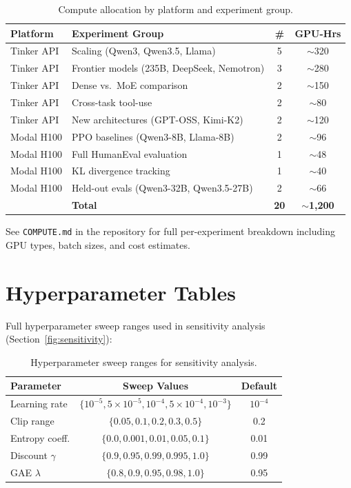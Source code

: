 \documentclass{article}
\begin{document}
\begin{table}[htbp]
\centering
\caption{Compute allocation by platform and experiment group.}
\small
\begin{tabular}{@{}llcc@{}}
\toprule
\textbf{Platform} & \textbf{Experiment Group} & \textbf{\#} & \textbf{GPU-Hrs} \\
\midrule
Tinker API & Scaling (Qwen3, Qwen3.5, Llama) & 5 & $\sim$320 \\
Tinker API & Frontier models (235B, DeepSeek, Nemotron) & 3 & $\sim$280 \\
Tinker API & Dense vs.~MoE comparison & 2 & $\sim$150 \\
Tinker API & Cross-task tool-use & 2 & $\sim$80 \\
Tinker API & New architectures (GPT-OSS, Kimi-K2) & 2 & $\sim$120 \\
Modal H100 & PPO baselines (Qwen3-8B, Llama-8B) & 2 & $\sim$96 \\
Modal H100 & Full HumanEval evaluation & 1 & $\sim$48 \\
Modal H100 & KL divergence tracking & 1 & $\sim$40 \\
Modal H100 & Held-out evals (Qwen3-32B, Qwen3.5-27B) & 2 & $\sim$66 \\
\midrule
 & \textbf{Total} & \textbf{20} & $\sim$\textbf{1,200} \\
\bottomrule
\end{tabular}
\end{table}

See \texttt{COMPUTE.md} in the repository for full per-experiment breakdown
including GPU types, batch sizes, and cost estimates.

\section{Hyperparameter Tables}
\label{app:hyperparams}

Full hyperparameter sweep ranges used in sensitivity analysis (Section~\ref{fig:sensitivity}):

\begin{table}[htbp]
\centering
\caption{Hyperparameter sweep ranges for sensitivity analysis.}
\begin{tabular}{lcc}
\toprule
\textbf{Parameter} & \textbf{Sweep Values} & \textbf{Default} \\
\midrule
Learning rate & $\{10^{-5}, 5 \times 10^{-5}, 10^{-4}, 5 \times 10^{-4}, 10^{-3}\}$ & $10^{-4}$ \\
Clip range & $\{0.05, 0.1, 0.2, 0.3, 0.5\}$ & 0.2 \\
Entropy coeff. & $\{0.0, 0.001, 0.01, 0.05, 0.1\}$ & 0.01 \\
Discount $\gamma$ & $\{0.9, 0.95, 0.99, 0.995, 1.0\}$ & 0.99 \\
GAE $\lambda$ & $\{0.8, 0.9, 0.95, 0.98, 1.0\}$ & 0.95 \\
\bottomrule
\end{tabular}
\end{table}
\end{document}
